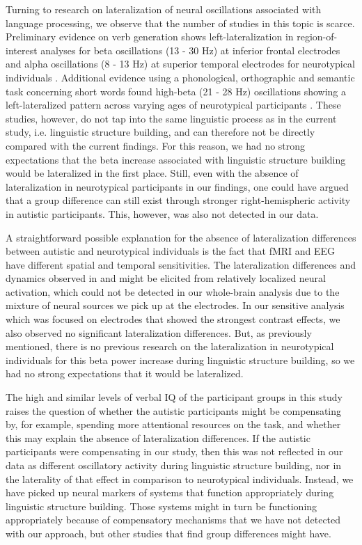 Turning to research on lateralization of neural oscillations associated with language processing, we observe that the number of studies in this topic is scarce. Preliminary evidence on verb generation shows left-lateralization in region-of-interest analyses for beta oscillations (13 - 30 Hz) at inferior frontal electrodes and alpha oscillations (8 - 13 Hz) at superior temporal electrodes for neurotypical individuals \citep{nix2024}. Additional evidence using a phonological, orthographic and semantic task concerning short words found high-beta (21 - 28 Hz) oscillations showing a left-lateralized pattern across varying ages of neurotypical participants \citep{spironelli2010}. These studies, however, do not tap into the same linguistic process as in the current study, i.e. linguistic structure building, and can therefore not be directly compared with the current findings. For this reason, we had no strong expectations that the beta increase associated with linguistic structure building would be lateralized in the first place. Still, even with the absence of lateralization in neurotypical participants in our findings, one could have argued that a group difference can still exist through stronger right-hemispheric activity in autistic participants. This, however, was also not detected in our data. 

A straightforward possible explanation for the absence of lateralization differences between autistic and neurotypical individuals is the fact that fMRI and EEG have different spatial and temporal sensitivities. The lateralization differences and dynamics observed in \cite{jouravlev2020} and \cite{fedorenko2016} might be elicited from relatively localized neural activation, which could not be detected in our whole-brain analysis due to the mixture of neural sources we pick up at the electrodes. In our sensitive analysis which was focused on electrodes that showed the strongest contrast effects, we also observed no significant lateralization differences. But, as previously mentioned, there is no previous research on the lateralization in neurotypical individuals for this beta power increase during linguistic structure building, so we had no strong expectations that it would be lateralized. 

The high and similar levels of verbal IQ of the participant groups in this study raises the question of whether the autistic participants might be compensating by, for example, spending more attentional resources on the task, and whether this may explain the absence of lateralization differences. If the autistic participants were compensating in our study, then this was not reflected in our data as different oscillatory activity during linguistic structure building, nor in the laterality of that effect in comparison to neurotypical individuals. Instead, we have picked up neural markers of systems that function appropriately during linguistic structure building. Those systems might in turn be functioning appropriately because of compensatory mechanisms that we have not detected with our approach, but other studies that find group differences might have.

